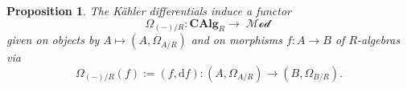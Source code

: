 \documentclass{amsart}
\newtheorem{proposition}[equation]{Proposition}
\theoremstyle{definition}
\DeclareMathOperator{\res}{res}
\DeclareMathOperator{\MMod}{\mathcal{Mod}}
\newcommand{\CAlg}[1]{\mathbf{CAlg}_{#1}}
\newcommand{\Mod}[1]{{#1}\textnormal{-}\mathbf{Mod}}
\newcommand{\Kah}[2]{\Omega_{{#1}/{#2}}}
\numberwithin{equation}{subsection}
\begin{document}

\begin{proposition}\label{Prop: Section Kahlers: Kahler diffles are functors}
	The K{\"a}hler differentials induce  a functor
	\[
	\Kah{(-)}{R}:\CAlg{R} \to \MMod
	\]
	given on objects by $A \mapsto (A,\Kah{A}{R})$ and on morphisms $f:A \to B$ of $R$-algebras via
	\[
	\Kah{(-)}{R}(f) := (f,\mathrm{d}f):\left(A,\Kah{A}{R}\right) \to \left(B,\Kah{B}{R}\right).
	\]
\end{proposition}
\end{document}
